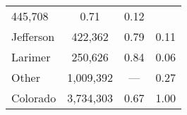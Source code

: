 \documentclass[12pt,twoside]{reedthesis}
\begin{document}
\begin{longtable}[]{@{}lccc@{}}
\begin{minipage}[t]{0.24\columnwidth}
  445,708\strut
  \end{minipage} & \begin{minipage}[t]{0.29\columnwidth}\centering\strut
  0.71\strut
  \end{minipage} & \begin{minipage}[t]{0.25\columnwidth}\centering\strut
  0.12\strut
  \end{minipage}\tabularnewline
  \begin{minipage}[t]{0.10\columnwidth}\raggedright\strut
  Jefferson\strut
  \end{minipage} & \begin{minipage}[t]{0.24\columnwidth}\centering\strut
  422,362\strut
  \end{minipage} & \begin{minipage}[t]{0.29\columnwidth}\centering\strut
  0.79\strut
  \end{minipage} & \begin{minipage}[t]{0.25\columnwidth}\centering\strut
  0.11\strut
  \end{minipage}\tabularnewline
  \begin{minipage}[t]{0.10\columnwidth}\raggedright\strut
  Larimer\strut
  \end{minipage} & \begin{minipage}[t]{0.24\columnwidth}\centering\strut
  250,626\strut
  \end{minipage} & \begin{minipage}[t]{0.29\columnwidth}\centering\strut
  0.84\strut
  \end{minipage} & \begin{minipage}[t]{0.25\columnwidth}\centering\strut
  0.06\strut
  \end{minipage}\tabularnewline
  \begin{minipage}[t]{0.10\columnwidth}\raggedright\strut
  Other\strut
  \end{minipage} & \begin{minipage}[t]{0.24\columnwidth}\centering\strut
  1,009,392\strut
  \end{minipage} & \begin{minipage}[t]{0.29\columnwidth}\centering\strut
  ---\strut
  \end{minipage} & \begin{minipage}[t]{0.25\columnwidth}\centering\strut
  0.27\strut
  \end{minipage}\tabularnewline
  \begin{minipage}[t]{0.10\columnwidth}\raggedright\strut
  Colorado\strut
  \end{minipage} & \begin{minipage}[t]{0.24\columnwidth}\centering\strut
  3,734,303\strut
  \end{minipage} & \begin{minipage}[t]{0.29\columnwidth}\centering\strut
  0.67\strut
  \end{minipage} & \begin{minipage}[t]{0.25\columnwidth}\centering\strut
  1.00\strut
  \end{minipage}\tabularnewline
  \bottomrule
  \end{longtable}
  
\end{document}
